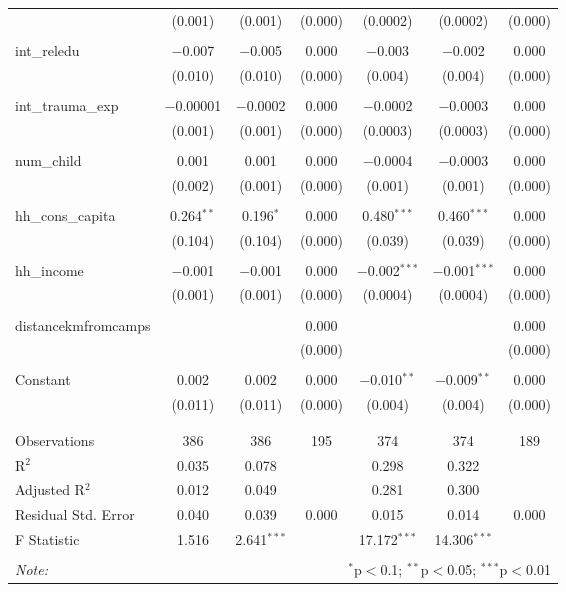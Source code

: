 \begin{table}[H]
\begin{tabular}{@{\extracolsep{4pt}}lcccccc}
  & (0.001) & (0.001) & (0.000) & (0.0002) & (0.0002) & (0.000) \\ 
  & & & & & & \\ 
 int\_reledu & $-$0.007 & $-$0.005 & 0.000 & $-$0.003 & $-$0.002 & 0.000 \\ 
  & (0.010) & (0.010) & (0.000) & (0.004) & (0.004) & (0.000) \\ 
  & & & & & & \\ 
 int\_trauma\_exp & $-$0.00001 & $-$0.0002 & 0.000 & $-$0.0002 & $-$0.0003 & 0.000 \\ 
  & (0.001) & (0.001) & (0.000) & (0.0003) & (0.0003) & (0.000) \\ 
  & & & & & & \\ 
 num\_child & 0.001 & 0.001 & 0.000 & $-$0.0004 & $-$0.0003 & 0.000 \\ 
  & (0.002) & (0.001) & (0.000) & (0.001) & (0.001) & (0.000) \\ 
  & & & & & & \\ 
 hh\_cons\_capita & 0.264$^{**}$ & 0.196$^{*}$ & 0.000 & 0.480$^{***}$ & 0.460$^{***}$ & 0.000 \\ 
  & (0.104) & (0.104) & (0.000) & (0.039) & (0.039) & (0.000) \\ 
  & & & & & & \\ 
 hh\_income & $-$0.001 & $-$0.001 & 0.000 & $-$0.002$^{***}$ & $-$0.001$^{***}$ & 0.000 \\ 
  & (0.001) & (0.001) & (0.000) & (0.0004) & (0.0004) & (0.000) \\ 
  & & & & & & \\ 
 distancekmfromcamps &  &  & 0.000 &  &  & 0.000 \\ 
  &  &  & (0.000) &  &  & (0.000) \\ 
  & & & & & & \\ 
 Constant & 0.002 & 0.002 & 0.000 & $-$0.010$^{**}$ & $-$0.009$^{**}$ & 0.000 \\ 
  & (0.011) & (0.011) & (0.000) & (0.004) & (0.004) & (0.000) \\ 
  & & & & & & \\ 
\hline \\[-1.8ex] 
Observations & 386 & 386 & 195 & 374 & 374 & 189 \\ 
R$^{2}$ & 0.035 & 0.078 &  & 0.298 & 0.322 &  \\ 
Adjusted R$^{2}$ & 0.012 & 0.049 &  & 0.281 & 0.300 &  \\ 
Residual Std. Error & 0.040 & 0.039 & 0.000 & 0.015 & 0.014 & 0.000 \\ 
F Statistic & 1.516 & 2.641$^{***}$ &  & 17.172$^{***}$ & 14.306$^{***}$ &  \\ 
\hline 
\hline \\[-1.8ex] 
\textit{Note:}  & \multicolumn{6}{r}{$^{*}$p$<$0.1; $^{**}$p$<$0.05; $^{***}$p$<$0.01} \\ 
\end{tabular} 
\end{table} 
